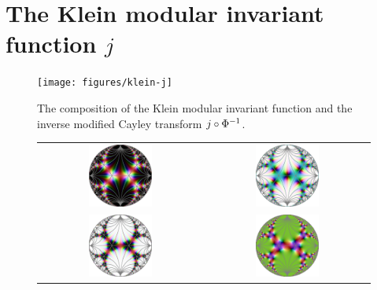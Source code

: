 \section{The Klein modular invariant function $j$}



\begin{figure}
\centering
\texttt{[image: figures/klein-j]}
\caption{The composition of the Klein modular invariant function and the inverse modified Cayley transform $j \circ {\Phi}^{-1}$.}
\label{fig_KleinJ}
\end{figure}

\begin{figure}
\centering
\begin{tabular}{c c}
\includegraphics[width=0.4\textwidth]{figures/klein-jinv} &
\includegraphics[width=0.4\textwidth]{figures/klein-jm1} \\
\includegraphics[width=0.4\textwidth]{figures/klein-jsqr} &
\includegraphics[width=0.4\textwidth]{figures/klein-j-mod-cayley}

\end{tabular}
\end{figure}
